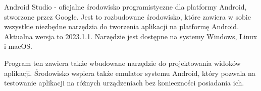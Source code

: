 Android Studio - oficjalne środowisko programistyczne dla platformy Android, stworzone przez Google. Jest to rozbudowane środowisko, które zawiera w sobie wszystkie niezbędne narzędzia do tworzenia aplikacji na platformę Android. Aktualna wersja to 2023.1.1. Narzędzie jest dostępne na systemy Windows, Linux i macOS. \autocite{android}

Program ten zawiera także wbudowane narzędzie do projektowania widoków aplikacji. Środowisko wspiera także emulator systemu Android, który pozwala na testowanie aplikacji na różnych urządzeniach bez konieczności posiadania ich.